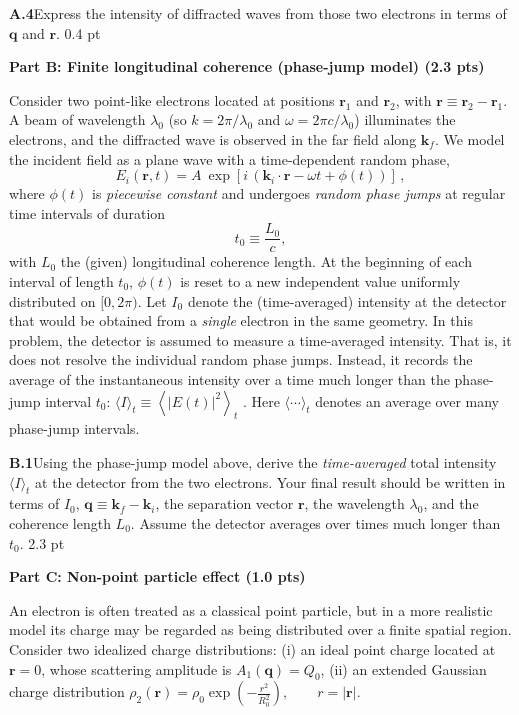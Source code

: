 \textbf{A.4}\quad Express the intensity of diffracted waves from those two
electrons in terms of $\mathbf{q}$ and $\mathbf{r}$. \hfill 0.4 pt

\textbf{Part B: Finite longitudinal coherence (phase-jump model) (2.3 pts)}

Consider two point-like electrons located at positions $\mathbf{r}_1$ and
$\mathbf{r}_2$, with $\mathbf{r} \equiv \mathbf{r}_2 - \mathbf{r}_1$. A beam of
wavelength $\lambda_0$ (so $k = 2\pi/\lambda_0$ and $\omega = 2\pi c/\lambda_0$)
illuminates the electrons, and the diffracted wave is observed in the far field
along $\mathbf{k}_f$. We model the incident field as a plane wave with a
time-dependent random phase,
\[
E_i(\mathbf{r}, t) = A\ \exp[i\,(\mathbf{k}_i\cdot\mathbf{r} - \omega t + \phi(t))]\,,
\]
where $\phi(t)$ is \textit{piecewise constant} and undergoes
\textit{random phase jumps} at regular time intervals of duration
\[
t_0 \equiv \frac{L_0}{c},
\]
with $L_0$ the (given) longitudinal coherence length. At the beginning of each
interval of length $t_0$, $\phi(t)$ is reset to a new independent value
uniformly distributed on $[0, 2\pi)$. Let $I_0$ denote the (time-averaged)
intensity at the detector that would be obtained from a \textit{single} electron
in the same geometry. In this problem, the detector is assumed to measure a
time-averaged intensity. That is, it does not resolve the individual random
phase jumps. Instead, it records the average of the instantaneous intensity
over a time much longer than the phase-jump interval $t_0$:
$\langle I\rangle_t \equiv \left\langle |E(t)|^2 \right\rangle_t$ . Here
$\langle\cdots\rangle_t$ denotes an average over many phase-jump intervals.

\textbf{B.1}\quad Using the phase-jump model above, derive the
\textit{time-averaged} total intensity $\langle I\rangle_t$ at the detector from
the two electrons. Your final result should be written in terms of $I_0$,
$\mathbf{q} \equiv \mathbf{k}_f - \mathbf{k}_i$, the separation vector
$\mathbf{r}$, the wavelength $\lambda_0$, and the coherence length $L_0$.
Assume the detector averages over times much longer than $t_0$. \hfill 2.3 pt

\textbf{Part C: Non-point particle effect (1.0 pts)}

An electron is often treated as a classical point particle, but in a more
realistic model its charge may be regarded as being distributed over a finite
spatial region. Consider two idealized charge distributions: (i) an ideal point
charge located at $\mathbf{r} = 0$, whose scattering amplitude is
$A_1(\mathbf{q}) = Q_0$, (ii) an extended Gaussian charge distribution
$\rho_2(\mathbf{r}) = \rho_0 \exp\left(-\frac{r^2}{R_0^2}\right), \qquad r = |\mathbf{r}|.$

